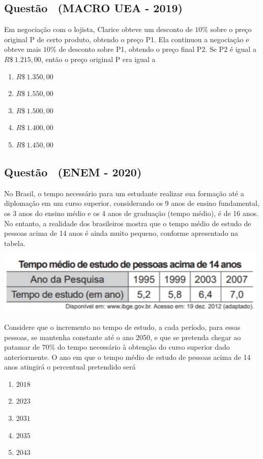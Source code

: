 \documentclass[12pt]{article}
\newcounter{questao}
\newcommand{\novaquestao}[1]{%
  \stepcounter{questao}%
  \subsection*{Questão \thequestao\ (#1)}%
}
\begin{document}
\begin{multicols}{2}
        \novaquestao{MACRO UEA - 2019}
            Em negociação com o lojista, Clarice obteve um desconto de $10\%$ sobre o preço original P de certo produto, obtendo o preço P1. Ela continuou a negociação e obteve mais $10\%$ de desconto sobre P1, obtendo o preço final P2. Se P2  é igual a $R\$\ 1.215,00$, então o preço original P era igual a

            \begin{enumerate}[label=(\alph*), noitemsep]
                \item $R\$\ 1.350,00$
                \item $R\$\ 1.550,00$
                \item $R\$\ 1.500,00$
                \item $R\$\ 1.400,00$
                \item $R\$\ 1.450,00$
            \end{enumerate}

        \novaquestao{ENEM - 2020}
            No Brasil, o tempo necessário para um estudante realizar sua formação até a diplomação em um curso superior, considerando os 9 anos de ensino fundamental, os 3 anos do ensino médio e os 4 anos de graduação (tempo médio), é de 16 anos. No entanto, a realidade dos brasileiros mostra que o tempo médio de estudo de pessoas acima de 14 anos é ainda muito pequeno, conforme apresentado na tabela.

            \begin{center}
                \includegraphics[scale=0.5]{q16.png}
            \end{center}Considere que o incremento no tempo de estudo, a cada período, para essas pessoas, se mantenha constante até o ano 2050, e que se pretenda chegar ao patamar de $70\%$ do tempo necessário à obtenção do curso superior dado anteriormente. O ano em que o tempo médio de estudo de pessoas acima de 14 anos atingirá o percentual pretendido será

            \begin{enumerate}[label=(\alph*), noitemsep]
                \item $2018$
                \item $2023$
                \item $2031$
                \item $2035$
                \item $2043$
            \end{enumerate}


\end{multicols}
\end{document}
